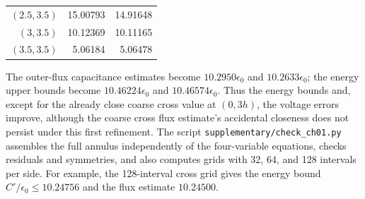 \begin{enumerate}
\begin{center}
\begin{tabular}{rrr}
$(2.5,3.5)$ & 15.00793 & 14.91648 \\
$(3,3.5)$ & 10.12369 & 10.11165 \\
$(3.5,3.5)$ & 5.06184 & 5.06478 \\
\bottomrule\end{tabular}
\end{center}
The outer-flux capacitance estimates become $10.2950\epsilon_0$ and
$10.2633\epsilon_0$; the energy upper bounds become
$10.46224\epsilon_0$ and $10.46574\epsilon_0$.
Thus the energy bounds and, except for the already close coarse cross value
at $(0,3h)$, the voltage errors improve, although the coarse cross
flux estimate's accidental closeness does not persist under this first
refinement. The script \texttt{supplementary/check\_ch01.py} assembles the full
annulus independently of the four-variable equations, checks residuals and
symmetries, and also computes grids with 32, 64, and 128 intervals per side.
For example, the 128-interval cross grid gives the energy bound
$C'/\epsilon_0\le10.24756$ and the flux estimate $10.24500$.
\end{enumerate}


